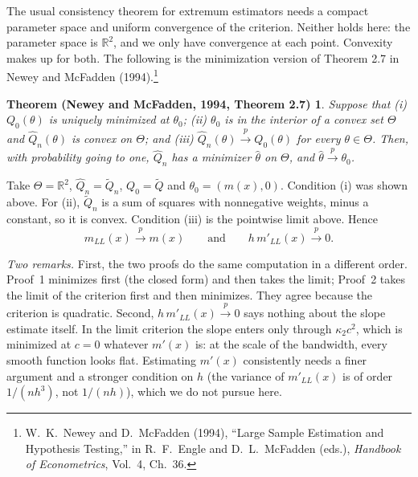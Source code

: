 \documentclass[11pt]{article}
\theoremstyle{plain}
\newtheorem*{nmtheorem}{Theorem (Newey and McFadden, 1994, Theorem 2.7)}
\begin{document}
The usual consistency theorem for extremum estimators needs a compact parameter space and uniform convergence of the criterion. Neither holds here: the parameter space is $\mathbb R^2$, and we only have convergence at each point. Convexity makes up for both. The following is the minimization version of Theorem 2.7 in Newey and McFadden (1994).\footnote{W.~K.~Newey and D.~McFadden (1994), ``Large Sample Estimation and Hypothesis Testing,'' in R.~F.~Engle and D.~L.~McFadden (eds.), \emph{Handbook of Econometrics}, Vol.~4, Ch.~36.}

\begin{nmtheorem}
Suppose that (i) $Q_0(\theta)$ is uniquely minimized at $\theta_0$; (ii) $\theta_0$ is in the interior of a convex set $\Theta$ and $\hat Q_n(\theta)$ is convex on $\Theta$; and (iii) $\hat Q_n(\theta)\xrightarrow{p}Q_0(\theta)$ for every $\theta\in\Theta$. Then, with probability going to one, $\hat Q_n$ has a minimizer $\hat\theta$ on $\Theta$, and $\hat\theta\xrightarrow{p}\theta_0$.
\end{nmtheorem}

Take $\Theta=\mathbb R^2$, $\hat Q_n=\tilde Q_n$, $Q_0=\tilde Q$ and $\theta_0=(m(x),0)$. Condition (i) was shown above. For (ii), $\tilde Q_n$ is a sum of squares with nonnegative weights, minus a constant, so it is convex. Condition (iii) is the pointwise limit above. Hence
\[
m_{LL}(x)\xrightarrow{p}m(x)\qquad\text{and}\qquad h\,m'_{LL}(x)\xrightarrow{p}0 .
\]

\emph{Two remarks.} First, the two proofs do the same computation in a different order. Proof~1 minimizes first (the closed form) and then takes the limit; Proof~2 takes the limit of the criterion first and then minimizes. They agree because the criterion is quadratic. Second, $h\,m'_{LL}(x)\xrightarrow{p}0$ says nothing about the slope estimate itself. In the limit criterion the slope enters only through $\kappa_2c^2$, which is minimized at $c=0$ whatever $m'(x)$ is: at the scale of the bandwidth, every smooth function looks flat. Estimating $m'(x)$ consistently needs a finer argument and a stronger condition on $h$ (the variance of $m'_{LL}(x)$ is of order $1/(nh^3)$, not $1/(nh)$), which we do not pursue here.
\end{document}
